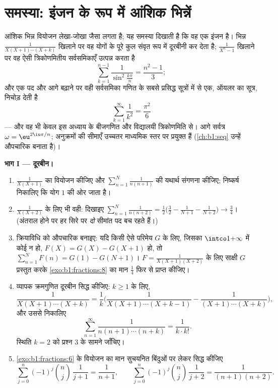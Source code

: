 \section{समस्या: इंजन के रूप में आंशिक भिन्नें}

\begin{problem}\label{pb:b1:fractions:1}
आंशिक भिन्न वियोजन लेखा-जोखा जैसा लगता है; यह समस्या दिखाती है कि वह एक इंजन
है। भिन्न $\frac1{X(X+1)\cdots(X+k)}$ खिलाने पर वह योगों के पूरे कुल संवृत
रूप में दूरबीनी कर देता है; $\frac1{X^n - 1}$ खिलाने पर वह ऐसी त्रिकोणमितीय
सर्वसमिकाएँ उत्पन्न करता है
\[
\sum_{k=1}^{n-1}\frac{1}{\sin^2\frac{k\pi}{n}} = \frac{n^2-1}{3} ;
\]
और एक पद और आगे बढ़ाने पर वही सर्वसमिका गणित के सबसे प्रसिद्ध सूत्रों में से
एक, ऑयलर का सूत्र, निचोड़ देती है
\[
\sum_{k=1}^{\infty}\frac1{k^2} = \frac{\pi^2}{6}
\]
--- और वह भी केवल इस अध्याय के बीजगणित और विद्यालयी त्रिकोणमिति
से। आगे सर्वत्र $\omega =
\eu^{2\iu\pi/n}$; अनुक्रमों की सीमाएँ उच्चतर माध्यमिक स्तर पर प्रयुक्त हैं
(\cref{ch:b1:seq} उन्हें औपचारिक बनाता है)।

\medskip \noindent\textbf{भाग I --- दूरबीन।}
\begin{enumerate}
  \item $\frac1{X(X+1)}$ का वियोजन कीजिए और $\sum_{n=1}^{N} \frac1{n(n+1)}$
  की यथार्थ संगणना कीजिए; निष्कर्ष निकालिए कि योग $1$ की ओर जाता है।
  \item $\frac1{X(X+2)}$ के लिए भी वही: दिखाइए $\sum_{n=1}^{N}
  \frac1{n(n+2)} = \frac12\bigl(\frac32 - \frac1{N+1} - \frac1{N+2}\bigr)
  \to \frac34$। (अंतराल होने पर हर सिरे पर \emph{दो} सीमांत पद बच रहते हैं।)
  \item क्रियाविधि को औपचारिक बनाइए: यदि किसी ऐसे परिमेय $G$ के लिए, जिसका
  $\intco1{+\infty}$ में कोई  न हो, $F(X) = G(X) - G(X+1)$ हो, तो
  $\sum_{n=1}^N F(n) = G(1) - G(N+1)$। $F = \frac1{X(X+1)(X+2)}$ के लिए
  साक्षी $G$ प्रस्तुत करके \cref{exo:b1:fractions:8} का मान $\frac14$ फिर से
  प्राप्त कीजिए।
  \item व्यापक क्रमगुणित दूरबीन सिद्ध कीजिए: $k \geq 1$ के लिए,
        \[
        \frac{1}{X(X+1)\cdots(X+k)}
        = \frac1k\biggl(\frac{1}{X(X+1)\cdots(X+k-1)}
        - \frac{1}{(X+1)\cdots(X+k)}\biggr),
        \]
        और उससे निकालिए
        \[
        \sum_{n=1}^{\infty}\frac{1}{n(n+1)\cdots(n+k)}
        = \frac{1}{k \cdot k!} .
        \]
        स्थिति $k = 2$ को प्रश्न 3 के सामने जाँचिए।
  \item \cref{exo:b1:fractions:6} के वियोजन का मान सुचयनित बिंदुओं पर लेकर
  सिद्ध कीजिए
        \[
        \sum_{j=0}^{n}(-1)^j\binom nj\,\frac1{j+1}
        = \frac1{n+1},
        \qquad
        \sum_{j=0}^{n}(-1)^j\binom nj\,\frac1{j+2}
        = \frac1{(n+1)(n+2)} .
        \]
\end{enumerate}


\end{problem}
